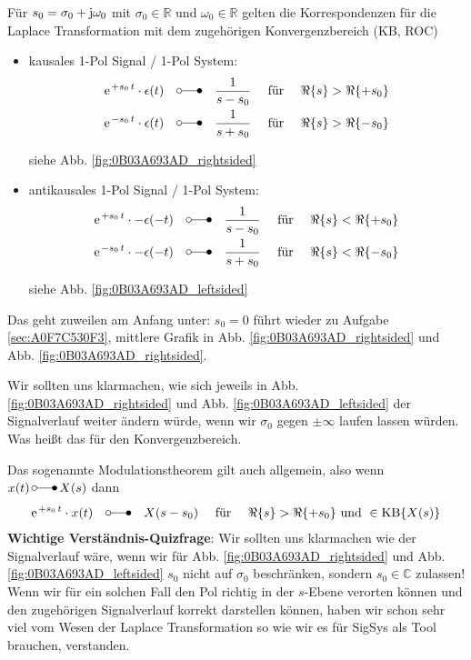 \documentclass[11pt,a4paper,DIV=12]{scrartcl}
\numberwithin{equation}{section}
\numberwithin{figure}{section}
\newcommand{\fig}[1]{Abb. \ref{#1}} %
\begin{document}
\begin{Loesung}
%
Für $s_0=\sigma_0 + \im \omega_0$ mit $\sigma_0\in\mathbb{R}$ und $\omega_0\in\mathbb{R}$
gelten die Korrespondenzen für die Laplace Transformation mit dem zugehörigen
Konvergenzbereich (KB, ROC)
%
\begin{itemize}
  \item kausales 1-Pol Signal / 1-Pol System:
  \begin{align}
  \e^{+s_0 \, t} \cdot \epsilon(t) \quad \laplace \quad \frac{1}{s-s_0} \quad\text{ für } \quad\Re\{s\} > \Re\{+s_0\}\\
  \e^{-s_0 \, t} \cdot \epsilon(t) \quad \laplace \quad \frac{1}{s+s_0} \quad\text{ für } \quad\Re\{s\} > \Re\{-s_0\}
  \end{align}

  siehe \fig{fig:0B03A693AD_rightsided}

  \item antikausales 1-Pol Signal / 1-Pol System:
  \begin{align}
  \e^{+s_0 \, t} \cdot -\epsilon(-t) \quad \laplace \quad \frac{1}{s-s_0} \quad\text{ für } \quad\Re\{s\} < \Re\{+s_0\}\\
  \e^{-s_0 \, t} \cdot -\epsilon(-t) \quad \laplace \quad \frac{1}{s+s_0} \quad\text{ für } \quad\Re\{s\} < \Re\{-s_0\}
  \end{align}

  siehe \fig{fig:0B03A693AD_leftsided}

\end{itemize}
%
Das geht zuweilen am Anfang unter: $s_0=0$ führt wieder zu Aufgabe \ref{sec:A0F7C530F3},
mittlere Grafik in \fig{fig:0B03A693AD_rightsided} und \fig{fig:0B03A693AD_rightsided}.

Wir sollten uns klarmachen, wie sich jeweils in
\fig{fig:0B03A693AD_rightsided} und \fig{fig:0B03A693AD_leftsided} der
Signalverlauf weiter ändern würde, wenn
wir $\sigma_0$ gegen $\pm\infty$ laufen lassen würden.
Was heißt das für den Konvergenzbereich.

Das sogenannte Modulationstheorem gilt auch allgemein, also wenn
$x(t) \,\laplace\, X(s)$
%
dann
\begin{align}
\e^{+s_0 \, t} \cdot x(t) \quad \laplace \quad X(s-s_0) \quad\text{ für } \quad\Re\{s\} > \Re\{+s_0\}\textrm{ und }\in\mathrm{KB}\{X(s)\}
\end{align}
%
\textbf{Wichtige Verständnis-Quizfrage}:
Wir sollten uns klarmachen wie der Signalverlauf wäre, wenn wir
für \fig{fig:0B03A693AD_rightsided} und \fig{fig:0B03A693AD_leftsided}
$s_0$ nicht auf $\sigma_0$ beschränken, sondern $s_0\in\mathbb{C}$ zulassen!
Wenn wir für ein solchen Fall den Pol richtig in der $s$-Ebene verorten können
und den zugehörigen Signalverlauf korrekt darstellen können, haben wir
schon sehr viel vom Wesen der Laplace Transformation so wie wir es für SigSys
als Tool brauchen, verstanden.
%
\end{Loesung}
\end{document}
